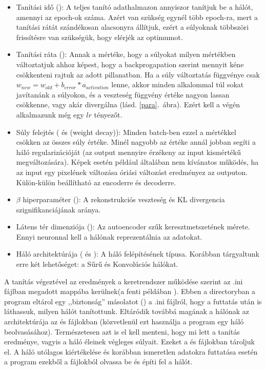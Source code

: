\begin{itemize}
  \item Tanítási idő (): A teljes tanító adathalmazon annyiszor tanítjuk be a hálót, amennyi az epoch-ok száma. Azért van szükség egynél több epoch-ra, mert a tanítási rátát szándékosan alacsonyra állítjuk, ezért a súlyoknak többszöri frissítésre van szükségük, hogy elérjék az optimumot.
  \item Tanítási ráta (): Annak a mértéke, hogy a súlyokat milyen mértékben változtatjuk ahhoz képest, hogy a backprogapation szerint mennyit kéne csökkenteni rajtuk az adott pillanatban. Ha a súly változtatás függvénye csak $ w_{new} =  w_{old} + b_{error} * a_{activation}$ lenne, akkor minden alkalommal túl sokat javítanánk a súlyokon, és a veszteség függvény értéke nagyon lassan csökkenne, vagy akár divergálna (lásd. \ref{para}.~ábra). Ezért kell a végén alkalmazunk még egy $lr$ tényezőt.
  \item Súly felejtés ( és  (weight decay)): Minden batch-ben ezzel a mértékkel csökken az összes súly értéke. Minél nagyobb az értéke annál jobban segíti a háló regularizációját (az output mennyire érzékeny az input kismértékű megváltozására). Képek esetén például általában nem kívánatos működés, ha az input egy pixelének változása óriási változást eredményez az outputon. Külön-külön beállítható az encoderre és decoderre.
  \item $\beta$ hiperparaméter  (): A rekonstrukciós veszteség és KL divergencia szignifikanciájának aránya.
  \item Látens tér dimenziója (): Az autoencoder szűk keresztmetszetének mérete. Ennyi neuronnal kell a hálónak reprezentálnia az adatokat.
  \item Háló architektúrája ( és ): A háló felépítésének típusa. Korábban tárgyaltunk erre két lehetőséget: a Sűrű és Konvolúciós hálókat.
\end{itemize}

A tanítás végeztével az eredmények a keretrendszer működése szerint az .ini fájlban megadott  mappába kerülnek\newline (a fenti példában ). Ebben a directoryban a program eltárol egy ,,biztonság'' másolatot () a .ini fájlról, hogy a futtatás után is láthassuk, milyen hálót tanítottunk. Eltáródik továbbá magának a hálónak az architektúrája az  és  fájlokban (közvetlenül ezt használja a program egy háló beolvasásához). Természetesen azt is el kell menteni, hogy mi lett a tanítás eredménye, vagyis a háló éleinek végleges súlyait. Ezeket a  és  fájlokban tároljuk el. A háló utólagos kiértékelése és korábban ismeretlen adatokra futtatása esetén a program ezekből a fájlokból olvassa be és építi fel a hálót.

